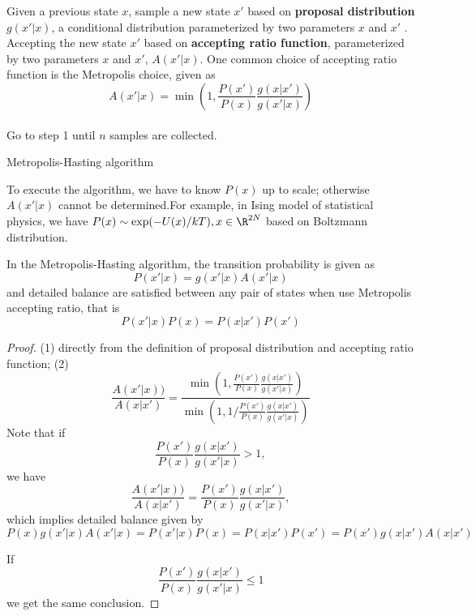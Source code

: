 \begin{refsection}
\begin{algorithm}[H]
	\SetAlgoLined
	Given a previous state $x$, sample a new state $x'$ based on \textbf{proposal distribution} $g(x'|x)$, a conditional distribution parameterized by two parameters $x$ and $x'$ .\\
	Accepting the new state $x'$ based on \textbf{accepting ratio function}, parameterized by two parameters $x$ and $x'$, $A(x'|x)$. One common choice of accepting ratio function is the Metropolis choice, given as
	$$A(x'|x) = \min(1,\frac{P(x')}{P(x)}\frac{g(x|x')}{g(x'|x)})$$\\
	Go to step 1 until $n$ samples are collected.\\
	\caption{Metropolis-Hasting algorithm}
\end{algorithm}


\begin{remark}
	To execute the algorithm, we have to know $P(x)$ up to scale; otherwise $A(x'|x)$ cannot be determined.For example, in Ising model of statistical physics, we have $P(x) \sim \exp(-U(x)/kT),x\in \R^{2N}$ based on Boltzmann distribution.
\end{remark}




\begin{lemma}
	In the Metropolis-Hasting algorithm, the transition probability is given as
	$$P(x'|x) = g(x'|x)A(x'|x)$$
	and detailed balance are satisfied between any pair of states when use Metropolis accepting ratio, that is
	$$P(x'|x)P(x) = P(x|x')P(x')$$	
\end{lemma}
\begin{proof}
	(1) directly from the definition of proposal distribution and accepting ratio function; (2) 
	$$\frac{A(x'|x))}{A(x|x')} = \frac{\min(1,\frac{P(x')}{P(x)}\frac{g(x|x')}{g(x'|x)})}{\min(1,1/\frac{P(x')}{P(x)}\frac{g(x|x')}{g(x'|x)})}$$
	Note that if $$\frac{P(x')}{P(x)}\frac{g(x|x')}{g(x'|x)} >1,$$ we have 
	$$\frac{A(x'|x))}{A(x|x')} = \frac{P(x')}{P(x)}\frac{g(x|x')}{g(x'|x)},$$
	which implies detailed balance given by
	$$P(x)g(x'|x)A(x'|x)=P(x'|x)P(x) = P(x|x')P(x') = P(x')g(x|x')A(x|x')$$
	
	If $$\frac{P(x')}{P(x)}\frac{g(x|x')}{g(x'|x)} \leq 1$$ we get the same conclusion.
\end{proof}


\end{refsection}
